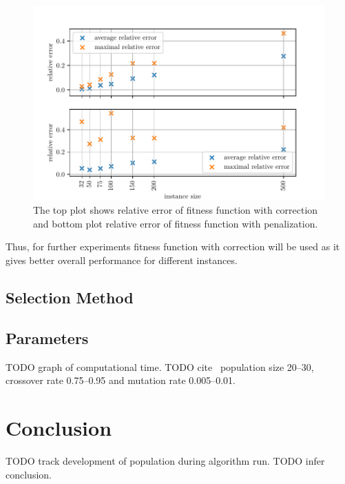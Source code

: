 \documentclass{article}
\begin{document}
\begin{figure}[ht]
\vskip 0.2in
\begin{center}
\centerline{\includegraphics[width=\columnwidth]{fitness}}
\caption{The top plot shows relative error of fitness function with
correction and bottom plot relative error of fitness function with
penalization.}
\label{fitness}
\end{center}
\vskip -0.2in
\end{figure}

Thus, for further experiments fitness function with correction will be used
as it gives better overall performance for different instances.

\subsection{Selection Method}

\subsection{Parameters}

TODO graph of computational time.
TODO cite~\cite{schaffer1989} population size 20--30,
crossover rate 0.75--0.95
and mutation rate 0.005--0.01.

\section{Conclusion}

TODO track development of population during algorithm run.
TODO infer conclusion.




\end{document}
